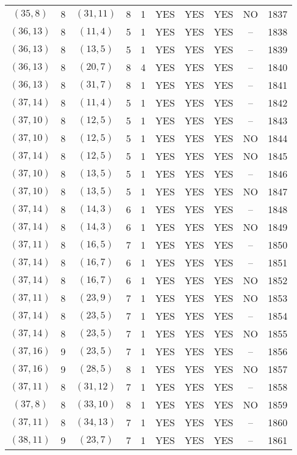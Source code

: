 \begin{longtable}{|c|c|c|c|c|c|c|c|c|c|}
$(35, 8)$ & 8 & $(31, 11)$ & 8 & 1 & YES & YES & YES & NO & 1837\\
$(36, 13)$ & 8 & $(11, 4)$ & 5 & 1 & YES & YES & YES & -- & 1838\\
$(36, 13)$ & 8 & $(13, 5)$ & 5 & 1 & YES & YES & YES & -- & 1839\\
$(36, 13)$ & 8 & $(20, 7)$ & 8 & 4 & YES & YES & YES & -- & 1840\\
$(36, 13)$ & 8 & $(31, 7)$ & 8 & 1 & YES & YES & YES & -- & 1841\\
$(37, 14)$ & 8 & $(11, 4)$ & 5 & 1 & YES & YES & YES & -- & 1842\\
$(37, 10)$ & 8 & $(12, 5)$ & 5 & 1 & YES & YES & YES & -- & 1843\\
$(37, 10)$ & 8 & $(12, 5)$ & 5 & 1 & YES & YES & YES & NO & 1844\\
$(37, 14)$ & 8 & $(12, 5)$ & 5 & 1 & YES & YES & YES & NO & 1845\\
$(37, 10)$ & 8 & $(13, 5)$ & 5 & 1 & YES & YES & YES & -- & 1846\\
$(37, 10)$ & 8 & $(13, 5)$ & 5 & 1 & YES & YES & YES & NO & 1847\\
$(37, 14)$ & 8 & $(14, 3)$ & 6 & 1 & YES & YES & YES & -- & 1848\\
$(37, 14)$ & 8 & $(14, 3)$ & 6 & 1 & YES & YES & YES & NO & 1849\\
$(37, 11)$ & 8 & $(16, 5)$ & 7 & 1 & YES & YES & YES & -- & 1850\\
$(37, 14)$ & 8 & $(16, 7)$ & 6 & 1 & YES & YES & YES & -- & 1851\\
$(37, 14)$ & 8 & $(16, 7)$ & 6 & 1 & YES & YES & YES & NO & 1852\\
$(37, 11)$ & 8 & $(23, 9)$ & 7 & 1 & YES & YES & YES & NO & 1853\\
$(37, 14)$ & 8 & $(23, 5)$ & 7 & 1 & YES & YES & YES & -- & 1854\\
$(37, 14)$ & 8 & $(23, 5)$ & 7 & 1 & YES & YES & YES & NO & 1855\\
$(37, 16)$ & 9 & $(23, 5)$ & 7 & 1 & YES & YES & YES & -- & 1856\\
$(37, 16)$ & 9 & $(28, 5)$ & 8 & 1 & YES & YES & YES & NO & 1857\\
$(37, 11)$ & 8 & $(31, 12)$ & 7 & 1 & YES & YES & YES & -- & 1858\\
$(37, 8)$ & 8 & $(33, 10)$ & 8 & 1 & YES & YES & YES & NO & 1859\\
$(37, 11)$ & 8 & $(34, 13)$ & 7 & 1 & YES & YES & YES & -- & 1860\\
$(38, 11)$ & 9 & $(23, 7)$ & 7 & 1 & YES & YES & YES & -- & 1861\\

\end{longtable}
